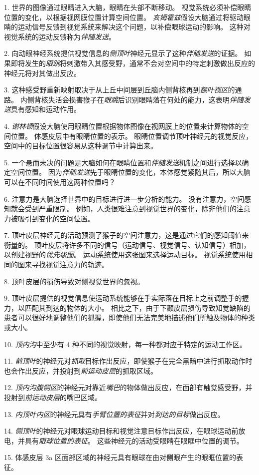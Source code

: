 1. 世界的图像通过眼睛进入大脑，眼睛在头部不断移动。
视觉系统必须补偿眼睛位置的变化，以根据视网膜位置计算空间位置。
\textit{亥姆霍兹}假设大脑通过将驱动眼睛的运动信号反馈到视觉系统来解决这个问题，以补偿眼球运动的影响。
这种对视觉系统的运动反馈称为\textit{伴随发送}。


2. 向动眼神经系统提供视觉信息的\textit{侧顶叶}神经元显示了这种\textit{伴随发送}的证据。
如果即将发生的\textit{眼跳}将刺激带入其感受野，通常不会对空间中的特定刺激做出反应的神经元将对其做出反应。


3. 这种感受野重新映射取决于从上丘中间层到丘脑内侧背核再到\textit{额叶视区}的通路。
内侧背核失活会损害猴子在\textit{眼跳}后识别眼睛落在何处的能力，这表明\textit{伴随发送}具有感知和运动作用。


4. \textit{谢林顿}假设大脑使用眼睛位置根据物体图像在视网膜上的位置来计算物体的空间位置。
体感皮层中有眼睛位置的表示。
眼睛位置调节顶叶神经元的视觉反应，空间中的目标位置很容易从这种调节中计算出来。


5. 一个悬而未决的问题是大脑如何在眼睛位置和\textit{伴随发送}机制之间进行选择以确定空间位置。
因为\textit{伴随发送}先于眼睛位置的变化，本体感觉紧随其后，所以大脑可以在不同时间使用这两种位置吗？


6. 注意力是大脑选择世界中的目标进行进一步分析的能力。
没有注意力，空间感知就会受到严重限制。
例如，人类很难注意到视觉世界的变化，除非他们的注意力被吸引到变化的空间位置。


7. 顶叶皮层神经元的活动预测了猴子的空间注意力，这是通过它们的感知阈值来衡量的。
顶叶皮层将许多不同的信号（运动信号、视觉信号、认知信号）相加，以创建视野的\textit{优先级图}。
运动系统使用这张图来选择运动目标。
视觉系统使用相同的图来寻找视觉注意力的轨迹。


8. 顶叶皮层的损伤导致对侧视觉世界的忽视。


9. 顶叶皮层提供的视觉信息使运动系统能够在手实际落在目标上之前调整手的握力，以匹配其到达的物体的大小。
相比之下，由于下颞皮层损伤导致知觉缺陷的患者可以很好地调整他们的抓握，即使他们无法完美地描述他们所触及物体的种类或大小。


10. \textit{顶内沟}中至少有 4 种不同的视觉映射，每一种都对应于特定的运动工作区。


11. \textit{前顶叶}的神经元对\textit{抓取}目标作出反应，即使猴子在完全黑暗中进行抓取动作时也会作出反应，并投射到\textit{前运动皮层}的抓取区域。


12. \textit{顶内沟腹侧区}的神经元对靠近\textit{嘴巴}的物体做出反应，在面部有触觉感受野，并投射到\textit{前运动皮层}的嘴巴区域。 


13. \textit{内顶叶内区}的神经元具有\textit{手臂位置的表征}并对\textit{到达的目标}做出反应。


14. \textit{侧顶叶}的神经元对眼球运动目标和视觉注意目标作出反应，在眼球运动前放电，并具有\textit{眼球位置的表征}。
这些神经元的活动受眼睛在眼眶中位置的调节。


15. 体感皮层 3a 区面部区域的神经元具有眼球在由对侧眼产生的眼眶位置的表征。


